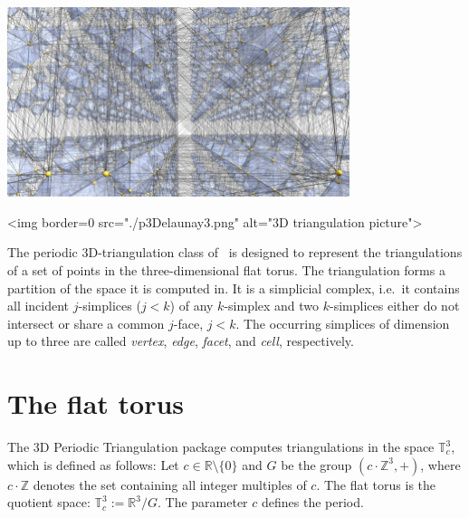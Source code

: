 %

\begin{ccTexOnly}
\begin{center}
\includegraphics[width=10cm]{Periodic_3_triangulation_3/p3Delaunay3}
\end{center}
\end{ccTexOnly}
\begin{ccHtmlOnly}
<img border=0 src="./p3Delaunay3.png" alt="3D triangulation picture">
\end{ccHtmlOnly}

The periodic 3D-triangulation class of \cgal\ is designed to
represent the triangulations of a set of points in the
three-dimensional flat torus. The triangulation forms a partition of
the space it is computed in. It is a simplicial complex, i.e.\ it
contains all incident $j$-simplices ($j<k$) of any $k$-simplex and two
$k$-simplices either do not intersect or share a common $j$-face,
$j<k$. The occurring simplices of dimension up to three are called
\emph{vertex}, \emph{edge}, \emph{facet}, and \emph{cell}, respectively.

\section{The flat torus\label{P3Triangulation3-sec-space}}
The 3D Periodic Triangulation package computes triangulations in the
space $\mathbb T_c^3$, which is defined as follows: Let $c\in\mathbb
R\setminus\{0\}$ and $G$ be the group $(c\cdot\mathbb Z^3, +)$, where
$c\cdot\mathbb Z$ denotes the set containing all integer multiples of
$c$. The flat torus is the quotient space: $\mathbb T_c^3:=\mathbb
R^3/G$. The parameter $c$ defines the period.

